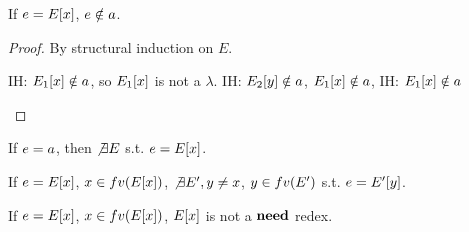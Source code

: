 \documentclass{article}
\begin{document}
\begin{lemma}
If $\e = \Ex$, $\e \notin \ans$.
\end{lemma}

\begin{proof}
By structural induction on $E$.
\begin{byCases}
  \case{\E = \hole}
  IH: $\Ex[_1] \notin \ans$, so $\Ex[_1]$ is not a $\lambda$.
  IH: $\Ey[_2] \notin \ans$, $\Ex[_1] \notin \ans$,
  IH: $\Ex[_1] \notin \ans$
\end{byCases}
\end{proof}

\begin{lemma}
If $\e = \ans$, then $\not\exists E$ s.t. $\e = \Ex$.
\end{lemma}

\begin{lemma}
If $\e = \Ex$, $x \in fv(\Ex)$, $\not\exists \E', y \neq x$, $y \in fv(\E')$
s.t. $\e = \Ey[']$.
\end{lemma}

\begin{lemma}
If $\e = \Ex$, $x \in fv(\Ex)$, $\Ex$ is not a $\need$ redex.
\end{lemma}
\end{document}
